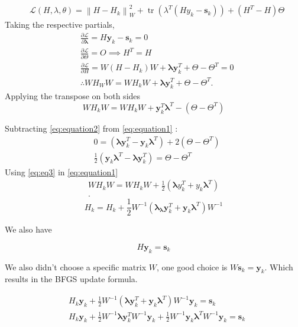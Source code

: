 \documentclass[12pt]{report}
\begin{document}
\begin{align}
	 & \mathcal L(H, \lambda, \theta)=\left\|H-H_{k}\right\|_{W}^{2}+\operatorname{tr}\left(\lambda^{T}\left(H y_{k}-\bm{s}_k\right)\right) +\left(H^{T}-H\right) \Theta
\end{align}
Taking the respective partials,
\begin{align}
	 & \frac{\partial\mathcal L}{\partial \bm{\lambda}}=H \bm{y}_k-\bm{s}_{k}=0\nonumber \\
	 & \frac{\partial\mathcal L}{\partial \Theta}= O \implies H^{T}=H\nonumber \\
	 & \frac{\partial\mathcal L}{\partial H}=W\left(H-H_{k}\right) W+\bm{\lambda} \bm{y}_k^{T}+\Theta-\Theta^{T}=0\nonumber \\
	 & \therefore W H_{W} W=W H_{k} W+ \bm{\lambda} \bm{y}_k^{T}+\Theta-\Theta^{T}\label{eq:equation1}
	.\end{align}
Applying the transpose on both sides
\begin{equation}
	W H_{k} W=W H_{k} W+\bm{y}_k^{T} \bm{\lambda}^{T}-\left(\Theta-\Theta^{T}\right) \label{eq:equation2}
\end{equation}

Subtracting \eqref{eq:equation2} from \eqref{eq:equation1} :
\begin{align}
	 & 0=\left(\bm \lambda  \bm{y}_k^{T}- \bm y_{k} \bm \lambda^{T}\right)+2\left(\Theta-\Theta^{T}\right)\nonumber \\
	 & \frac{1}{2}\left(\bm y_{k} \bm \lambda^{T}-\bm \lambda \bm y_{k}^{T}\right)=\Theta-\Theta^{T} \label{eq:eq3}
\end{align}
Using \eqref{eq:eq3} in \eqref{eq:equation1}
\begin{align*}
	W H_{k} W=W H_{k} W+\frac{1}{2}\left(\bm{\lambda} y_{k}^{T}+y_{k} \bm{\lambda}^{T}\right) \\
	.\end{align*}
$$
	H_{k}=H_{k}+\frac{1}{2} W^{-1}\left(\bm{\lambda}_{\bm{\lambda}} \bm{y}_k^{T}+\bm{y}_{k} \bm \lambda^{T}\right) W^{-1}
$$

We also have

$$
	H{\bm{y}_k}=\bm{s}_{k}
$$


We also didn't choose a specific matrix $W$, one good choice is $W \bm{s}_{k}=\bm{y}_k$. Which results in the BFGS update formula.


$$
	\begin{aligned}
		 & H_{k} \bm{y}_k+\frac{1}{2} W^{-1}\left(\bm{\lambda} \bm{y}_{k}^{T}+\bm{y}_{k} \bm{\lambda}^{T}\right) W^{-1} \bm{y}_{k}=\bm{s}_{k}                           \\
		 & H_{k} \bm{y}_k+\frac{1}{2} W^{-1} \bm{\lambda} \bm{y}_{k}^{T} W^{-1} \bm{y}_{k}+\frac{1}{2} W^{-1} \bm{y}_{k} \bm{\lambda}^{T} W^{-1} \bm{y}_{k} =\bm{s}_{k}
	\end{aligned}
$$
\end{document}
